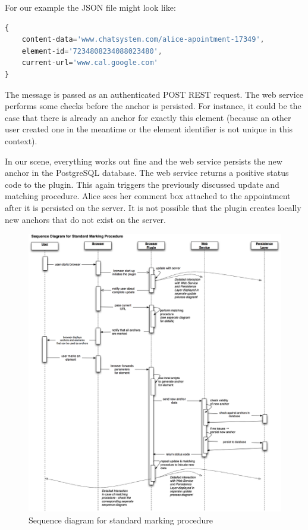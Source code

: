 For our example the JSON file might look like:

\begin{lstlisting}[language=JavaScript]
{
	content-data='www.chatsystem.com/alice-apointment-17349',
	element-id='7234808234088023480',
	current-url='www.cal.google.com'
}
\end{lstlisting}

The message is passed as an authenticated POST REST request. The web service performs some checks before the anchor is persisted. For instance, it could be the case that there is already an anchor for exactly this element (because an other user created one in the meantime or the element identifier is not unique in this context). 

In our scene, everything works out fine and the web service persists the new anchor in the PostgreSQL database. The web service returns a positive status code to the plugin. This again triggers the previously discussed update and matching procedure. Alice sees her comment box attached to the appointment after it is persisted on the server. It is not possible that the plugin creates locally new anchors that do not exist on the server. 

\begin{figure}\centering
		\includegraphics[width=13cm]{images/sequence-marking-process.png}
		\caption{Sequence diagram for standard marking procedure}
		\label{sequence-marking-process}
\end{figure} 

